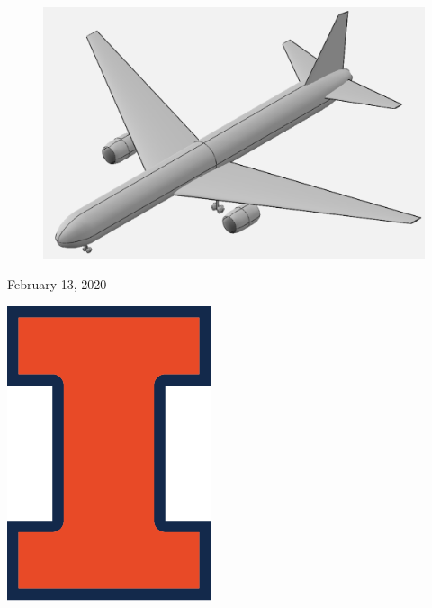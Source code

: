 \begin{titlepage}
	
        \begin{figure}[H]
            \centering
            \includegraphics[width=0.80\linewidth]{Photos/Isometric_Aircraft (2-12-20).png}
            \label{figISO}
        \end{figure}
	
	
	\vfill\vfill\vfill %
	
	{\large February 13, 2020} %
	
	
	\vfill\vfill
	\begin{minipage}{\linewidth}
		\begin{flushright}
	        \includegraphics[scale=0.5]{Photos/Illinois-Logo-Full-Color-RGB.png}\\[1cm]
		\end{flushright}
	\end{minipage}
	 
	
	\vfill %
	
\end{titlepage}




